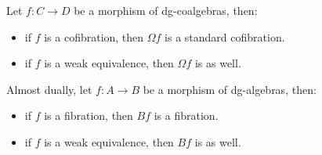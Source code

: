 \documentclass[../thesis.tex]{subfiles}
\begin{document}
            \begin{lemma}\label{lem: bar-cobar-Quill-adj}
                Let $f: C\rightarrow D$ be a morphism of dg-coalgebras, then:
                \begin{itemize}
                    \item if $f$ is a cofibration, then $\Omega f$ is a standard cofibration.
                    \item if $f$ is a weak equivalence, then $\Omega f$ is as well.
                \end{itemize}

                Almost dually, let $f: A\rightarrow B$ be a morphism of dg-algebras, then:
                \begin{itemize}
                    \item if $f$ is a fibration, then $B f$ is a fibration.
                    \item if $f$ is a weak equivalence, then $B f$ is as well.
                \end{itemize}
            \end{lemma}
\end{document}
